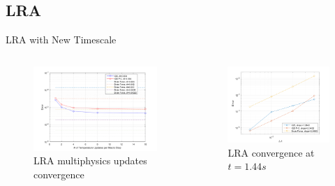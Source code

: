 \documentclass[8pt,xcolor=dvipnames]{beamer}
\begin{document}

\subsection{LRA}

\begin{frame}{LRA with New Timescale}

\begin{columns}

\begin{figure}
\caption{LRA multiphysics updates convergence}
\includegraphics[width=\linewidth]{figures/lra_mp.png}
\end{figure}

\begin{figure}
\caption{LRA convergence at $t=1.44s$}
\includegraphics[width=\linewidth]{figures/lra_mp_convergence.png}
\end{figure}

\end{columns}

\end{frame}
\end{document}
